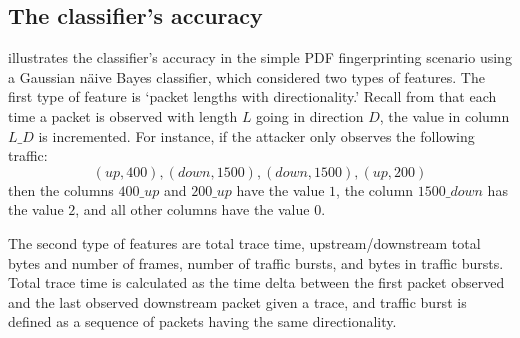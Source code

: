 \subsection{The classifier's accuracy\label{WFS12}}

\begin{table}
    \caption{Classifier's accuracy in the simple PDF fingerprinting scenario.}
    \centering
    \label{fig:accuracy_WFS1}
\end{table}

 illustrates the classifier's accuracy in the simple PDF fingerprinting scenario using a Gaussian näive Bayes classifier, which considered two types of features. The first type of feature is `packet lengths with directionality.' Recall from  that each time a packet is observed with length $L$ going in direction $D$, the value in column $L\_D$ is incremented. For instance, if the attacker only observes the following traffic:
$$
(up, 400), (down, 1500), (down, 1500), (up, 200)
$$
then the columns $400\_up$ and $200\_up$ have the value $1$, the column $1500\_down$ has the value $2$, and all other columns have the value $0$.

The second type of features are total trace time, upstream/downstream total bytes and number of frames, number of traffic bursts, and bytes in traffic bursts. Total trace time is calculated as the time delta between the first packet observed and the last observed downstream packet given a trace, and traffic burst is defined as a sequence of packets having the same directionality.

